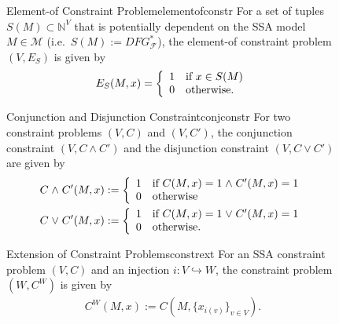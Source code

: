 \begin{figure}[h]
    \begin{definition}{Element-of Constraint Problem}{elementofconstr}
        For a set of tuples $S(M)\subset\mathbb N^V$ that is potentially
        dependent on the SSA model $M\in\mathcal M$
        (i.e.\ $S(M):=DFG_\mathcal F^*$),
        the element-of constraint problem $(V,E_S)$ is given by
        \begin{align*}
            E_S(M,x)=\left\{\begin{array}{l}
                                1\text{\quad if }x \in S(M)\\
                                0\text{\quad otherwise}.
                            \end{array}\right.
        \end{align*}
    \end{definition}

    \begin{definition}{Conjunction and Disjunction Constraint}{conjconstr}
        For two constraint problems $(V,C)$ and $(V,C')$, the
        conjunction constraint $(V,C\mathrel\land C')$ and the
        disjunction constraint $(V,C\mathrel\lor C')$ are given by
        \begin{align*}
            &C\mathrel\land C'(M,x):=\left\{
                \begin{array}{l}
                    1\text{\quad if }C(M,x)=1\mathrel\land C'(M,x)=1\\
                    0\text{\quad otherwise}
                \end{array}\right.\\
            &C\mathrel\lor C'(M,x):=\left\{
                \begin{array}{l}
                    1\text{\quad if }C(M,x)=1\mathrel\lor C'(M,x)=1\\
                    0\text{\quad otherwise}.
                \end{array}\right.
        \end{align*}
    \end{definition}

    \begin{definition}{Extension of Constraint Problems}{constrext}
        For an SSA constraint problem $(V,C)$ and an injection
        $i:V\hookrightarrow W$, the constraint problem $(W,C^W)$ is given by
        \begin{align*}
            C^W(M,x):=C(M,\{x_{i(v)}\}_{v\in V}).
        \end{align*}
    \end{definition}
\end{figure}

